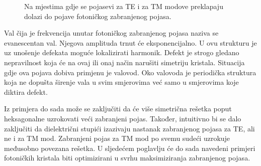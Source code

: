 \documentclass[utf8, seminar, numeric]{fer}
\begin{document}
\begin{figure}[ht]
\centering
    \qquad
	\caption{Na mjestima gdje se pojasevi za TE i za TM modove preklapaju dolazi
	do pojave fotoničkog zabranjenog pojasa.}
	\label{fig:triangular_lattice_holes}
\end{figure}

\FloatBarrier

Val čija je frekvencija unutar fotoničkog zabranjenog pojasa naziva se
evanescentan val.
Njegova amplituda trnut će eksponencijalno. U ovu strukturu je uz unošenje
defekata moguće lokalizirati harmonik. Defekt je strogo gledano nepravilnost
koja će na ovaj ili onaj način narušiti simetriju kristala. Situacija gdje ova
pojava dobiva primjenu je valovod. Oko valovoda je periodička struktura koja
ne dopušta širenje vala u svim smjerovima već samo u smjerovima koje diktira
defekt.

Iz primjera do sada može se zaključiti da će više simetrična rešetka poput
heksagonalne uzrokovati veći zabranjeni pojas. Također, intuitivno bi se dalo
zaključiti da dielektrični stupići izazivaju nastanak zabranjenog pojasa za TE,
ali ne i za TM mod. Zabranjeni pojas za TM mod po svemu sudeći uzrokuje
međusobno povezana rešetka. U sljedećem poglavlju će do sada navedeni
primjeri fotoničkih kristala biti optimizirani u svrhu maksimiziranja zabranjenog
pojasa.
\end{document}
